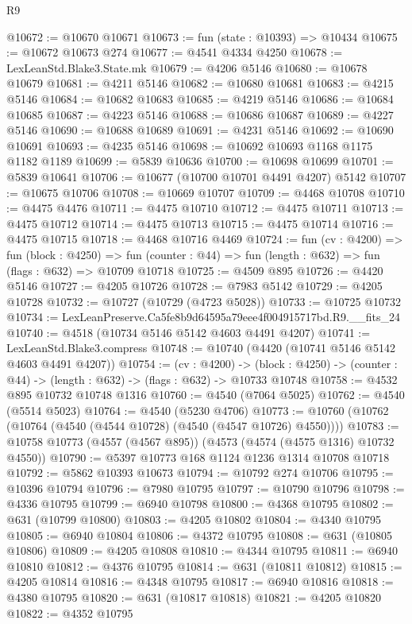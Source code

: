 \begin{lexlean}{R9}
\begin{coremodule}
@10672 := @10670 @10671
@10673 := fun (state : @10393) => @10434
@10675 := @10672 @10673 @274
@10677 := @4541 @4334 @4250
@10678 := LexLeanStd.Blake3.State.mk
@10679 := @4206 @5146
@10680 := @10678 @10679
@10681 := @4211 @5146
@10682 := @10680 @10681
@10683 := @4215 @5146
@10684 := @10682 @10683
@10685 := @4219 @5146
@10686 := @10684 @10685
@10687 := @4223 @5146
@10688 := @10686 @10687
@10689 := @4227 @5146
@10690 := @10688 @10689
@10691 := @4231 @5146
@10692 := @10690 @10691
@10693 := @4235 @5146
@10698 := @10692 @10693 @1168 @1175 @1182 @1189
@10699 := @5839 @10636
@10700 := @10698 @10699
@10701 := @5839 @10641
@10706 := @10677 (@10700 @10701 @4491 @4207) @5142
@10707 := @10675 @10706
@10708 := @10669 @10707
@10709 := @4468 @10708
@10710 := @4475 @4476
@10711 := @4475 @10710
@10712 := @4475 @10711
@10713 := @4475 @10712
@10714 := @4475 @10713
@10715 := @4475 @10714
@10716 := @4475 @10715
@10718 := @4468 @10716 @4469
@10724 := fun (cv : @4200) =>
  fun (block : @4250) =>
  fun (counter : @44) => fun (length : @632) => fun (flags : @632) => @10709 @10718
@10725 := @4509 @895
@10726 := @4420 @5146
@10727 := @4205 @10726
@10728 := @7983 @5142
@10729 := @4205 @10728
@10732 := @10727 (@10729 (@4723 @5028))
@10733 := @10725 @10732
@10734 := LexLeanPreserve.Ca5fe8b9d64595a79eee4f004915717bd.R9.__fits_24
@10740 := @4518 (@10734 @5146 @5142 @4603 @4491 @4207)
@10741 := LexLeanStd.Blake3.compress
@10748 := @10740 (@4420 (@10741 @5146 @5142 @4603 @4491 @4207))
@10754 := (cv : @4200) ->
  (block : @4250) -> (counter : @44) -> (length : @632) -> (flags : @632) -> @10733 @10748
@10758 := @4532 @895 @10732 @10748 @1316
@10760 := @4540 (@7064 @5025)
@10762 := @4540 (@5514 @5023)
@10764 := @4540 (@5230 @4706)
@10773 := @10760 (@10762 (@10764 (@4540 (@4544 @10728) (@4540 (@4547 @10726) @4550))))
@10783 := @10758 @10773 (@4557 (@4567 @895)) (@4573 (@4574 (@4575 @1316) @10732 @4550))
@10790 := @5397 @10773 @168 @1124 @1236 @1314 @10708 @10718
@10792 := @5862 @10393 @10673
@10794 := @10792 @274 @10706
@10795 := @10396 @10794
@10796 := @7980 @10795
@10797 := @10790 @10796
@10798 := @4336 @10795
@10799 := @6940 @10798
@10800 := @4368 @10795
@10802 := @631 (@10799 @10800)
@10803 := @4205 @10802
@10804 := @4340 @10795
@10805 := @6940 @10804
@10806 := @4372 @10795
@10808 := @631 (@10805 @10806)
@10809 := @4205 @10808
@10810 := @4344 @10795
@10811 := @6940 @10810
@10812 := @4376 @10795
@10814 := @631 (@10811 @10812)
@10815 := @4205 @10814
@10816 := @4348 @10795
@10817 := @6940 @10816
@10818 := @4380 @10795
@10820 := @631 (@10817 @10818)
@10821 := @4205 @10820
@10822 := @4352 @10795

\end{coremodule}
\end{lexlean}
